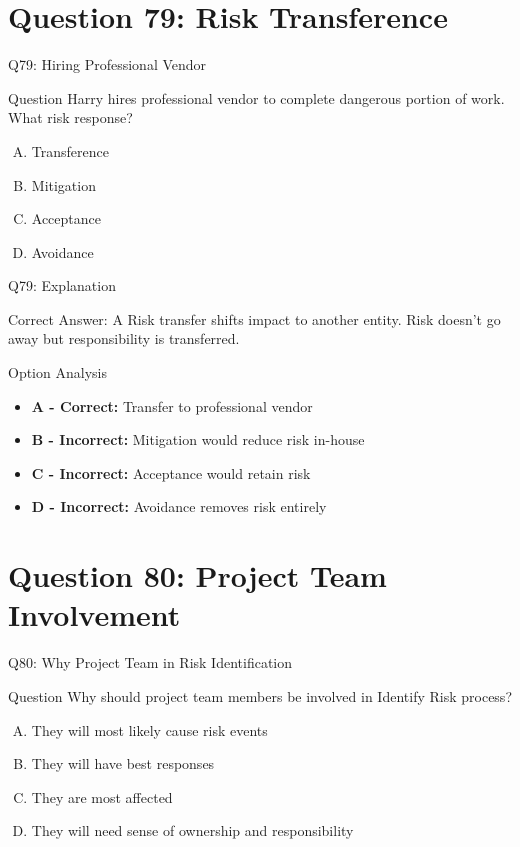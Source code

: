 \documentclass{beamer}
\begin{document}
	\section{Question 79: Risk Transference}
	
	\begin{frame}{Q79: Hiring Professional Vendor}
		\begin{block}{Question}
			Harry hires professional vendor to complete dangerous portion of work. What risk response?
		\end{block}
		\begin{enumerate}[(A)]
			\item Transference
			\item Mitigation
			\item Acceptance
			\item Avoidance
		\end{enumerate}
	\end{frame}
	
	\begin{frame}{Q79: Explanation}
		\begin{block}{Correct Answer: A}
			Risk transfer shifts impact to another entity. Risk doesn't go away but responsibility is transferred.
		\end{block}
		\begin{block}{Option Analysis}
			\begin{itemize}
				\item \textbf{A - Correct:} Transfer to professional vendor
				\item \textbf{B - Incorrect:} Mitigation would reduce risk in-house
				\item \textbf{C - Incorrect:} Acceptance would retain risk
				\item \textbf{D - Incorrect:} Avoidance removes risk entirely
			\end{itemize}
		\end{block}
	\end{frame}
	
	\section{Question 80: Project Team Involvement}
	
	\begin{frame}{Q80: Why Project Team in Risk Identification}
		\begin{block}{Question}
			Why should project team members be involved in Identify Risk process?
		\end{block}
		\begin{enumerate}[(A)]
			\item They will most likely cause risk events
			\item They will have best responses
			\item They are most affected
			\item They will need sense of ownership and responsibility
		\end{enumerate}
	\end{frame}
	
\end{document}
